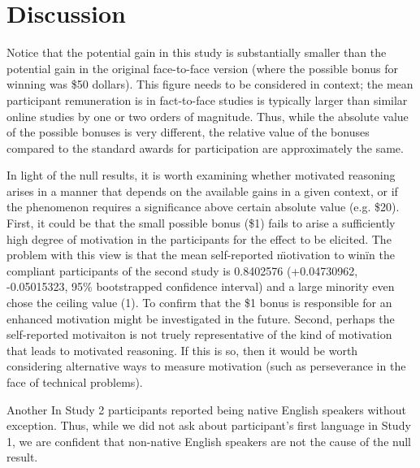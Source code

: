 \documentclass{article} \usepackage{apacite} \usepackage{graphicx} \usepackage{listings}
\begin{document}
\section{Discussion}


Notice that the potential gain in this study is substantially smaller than the potential gain in the original face-to-face version (where the possible bonus for winning was \$50 dollars). This figure needs to be considered in context; the mean participant remuneration is in fact-to-face studies is typically larger than similar online studies by one or two orders of magnitude. Thus, while the absolute value of the possible bonuses is very different, the relative value of the bonuses compared to the standard awards for participation are approximately the same. 

In light of the null results, it is worth examining whether motivated reasoning arises in a manner that depends on the available gains in a given context, or if the phenomenon requires a significance above certain absolute value (e.g. \$20). First, it could be that the small possible bonus (\$1) fails to arise a sufficiently high degree of motivation in the participants for the effect to be elicited. The problem with this view is that the mean self-reported \"motivation to win\" in the compliant participants of the second study is 0.8402576 (+0.04730962, -0.05015323, 95\% bootstrapped confidence interval) and a large minority even chose the ceiling value (1). To confirm that the \$1 bonus is responsible for an enhanced motivation might be investigated in the future. Second, perhaps the self-reported motivaiton is not truely representative of the kind of motivation that leads to motivated reasoning. If this is so, then it would be worth considering alternative ways to measure motivation (such as perseverance in the face of technical problems).

Another In Study 2 participants reported being native English speakers without exception. Thus, while we did not ask about participant's first language in Study 1, we are confident that non-native English speakers are not the cause of the null result. 
\end{document}
